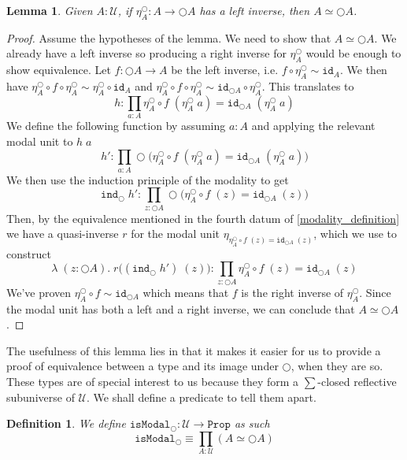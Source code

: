 \documentclass[12pt]{report}
\newtheorem{defn}[thm]{Definition}
\newtheorem{lem}[thm]{Lemma}
\begin{document}
\begin{lem}\label{modalUnitLeftInverse}
Given $A : \mathcal{U}$, if $\eta^\bigcirc_A : A \rightarrow \bigcirc A$ has a left inverse, then $A \simeq \bigcirc A$. 
\end{lem}
\begin{proof}
Assume the hypotheses of the lemma. 
We need to show that $A \simeq \bigcirc A$. 
We already have a left inverse so producing a right inverse for $\eta^\bigcirc_A$ would be enough to show equivalence. 
Let $f : \bigcirc A \rightarrow A$ be the left inverse, i.e. $f \circ \eta^\bigcirc_A \sim \mathtt{id}_A$. 
We then have $\eta^\bigcirc_A \circ f \circ \eta^\bigcirc_A \sim \eta^\bigcirc_A \circ \mathtt{id}_A$ and 
$\eta^\bigcirc_A \circ f \circ \eta^\bigcirc_A \sim \mathtt{id}_{\bigcirc A} \circ \eta^\bigcirc_A$. 
This translates to
$$h : \prod_{a : A}\eta^\bigcirc_A \circ f \;(\eta^\bigcirc_A\; a) = \mathtt{id}_{\bigcirc A} \; (\eta^\bigcirc_A\; a)$$
We define the following function by assuming $a : A$ and applying the relevant modal unit to $h\;a$ 
$$h' : \prod_{a : A}\bigcirc\big(\eta^\bigcirc_A \circ f \;(\eta^\bigcirc_A\; a) = \mathtt{id}_{\bigcirc A} \; (\eta^\bigcirc_A\; a) \big)$$
We then use the induction principle of the modality to get
$$\mathtt{ind}_{\bigcirc}\; h' : \prod_{z : \bigcirc A}\bigcirc\big(\eta^\bigcirc_A \circ f \;(z) = \mathtt{id}_{\bigcirc A} \; (z) \big)$$
Then, by the equivalence mentioned in the fourth datum of \ref{modality_definition} we have a quasi-inverse $r$ for the modal unit $\eta_{\eta^\bigcirc_A \circ f \;(z) = \mathtt{id}_{\bigcirc A} \; (z)}$, 
which we use to construct
$$ \lambda\;(z : \bigcirc A).\; r \big((\mathtt{ind}_{\bigcirc}\; h')\;(z)\big) : \prod_{z : \bigcirc A}\eta^\bigcirc_A \circ f \;(z) = \mathtt{id}_{\bigcirc A} \; (z) $$
We've proven $\eta^\bigcirc_A \circ f \sim \mathtt{id}_{\bigcirc A}$ which means that $ f$ is the right inverse of $\eta_A^\bigcirc$. 
Since the modal unit has both a left and a right inverse, we can conclude that $A \simeq \bigcirc A$. 
\end{proof}
The usefulness of this lemma lies in that it makes it easier for us to provide a proof of equivalence between a type and its image under $\bigcirc$, when they are so. 
These types are of special interest to us because they form a $\sum$-closed reflective subuniverse of $\mathcal{U}$. 
We shall define a predicate to tell them apart. 
\begin{defn}
We define $\mathtt{isModal}_{\bigcirc} : \mathcal{U} \rightarrow \mathtt{Prop}$ as such
$$\mathtt{isModal}_{\bigcirc} \equiv \prod_{A : \mathcal{U}}(A \simeq \bigcirc A)$$
\end{defn}
\end{document}
